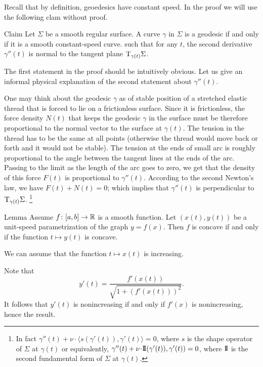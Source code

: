 Recall that by definition, geoedesics  have constant speed.
In the proof we will use the following clam without proof.

\begin{thm}{Claim}\label{clm:gamma''}
Let $\Sigma$ be a smooth regular surface.
A curve $\gamma$ in $\Sigma$ is a geodesic if and only if it is a smooth constant-speed curve.
such that  for any $t$, the second derivative $\gamma''(t)$ is normal to the tangent plane $\mathrm{T}_{\gamma(t)}\Sigma$.
\end{thm}

The first statement in the proof should be intuitively obvious.
Let us give an informal physical explanation of the second statement about $\gamma''(t)$.

One may think about the geodesic $\gamma$ as of stable position of a stretched elastic thread that is forced to lie on a frictionless surface.
Since it is frictionless, the force density $N(t)$ that keeps the geodesic $\gamma$ in the surface must be therefore proportional to the normal vector to the surface at $\gamma(t)$.
The tension in the thread has to be the same at all points (otherwise the thread would move back or forth and it would not be stable).
The tension at the ends of small arc is roughly proportional to the angle between the tangent lines at the ends of the arc. 
Passing to the limit as the length of the arc goes to zero, we get that the density of this force $F(t)$ is proportional to $\gamma''(t)$.
According to the second Newton's law, we have $F(t)+N(t)=0$;
which implies that  $\gamma''(t)$ is perpendicular to $\mathrm{T}_{\gamma(t)}\Sigma$.%
\footnote{In fact $\gamma''(t)+\nu\cdot \langle s(\gamma'(t)),\gamma'(t)\rangle=0$, where $s$ is the shape operator of $\Sigma$ at $\gamma(t)$ or equivalently,
$\gamma''(t)+\nu\cdot  \II(\gamma'(t)),\gamma'(t))=0$, where $\mathrm{I}\!\mathrm{I}$ is the second fundamental form of $\Sigma$ at $\gamma(t)$.}

\begin{thm}{Lemma}\label{lem:unit-speed} Assume $f\colon[a,b]\to\mathbb{R}$ is a smooth  function. 
Let $(x(t),y(t))$ be a unit-speed parametrization of the graph $y=f(x)$.
Then $f$ is concave if and only if the function $t\mapsto y(t)$ is concave.
\end{thm}

We can assume that the function $t\mapsto x(t)$ is increasing.

Note that 
\[y'(t)=\frac{f'(x(t))}{\sqrt{1+(f'(x(t)))^2}}.\]
It follows that  $y'(t)$ is nonincreasing if and only if $f'(x)$ is nonincreasing, hence the result.
\qeds

